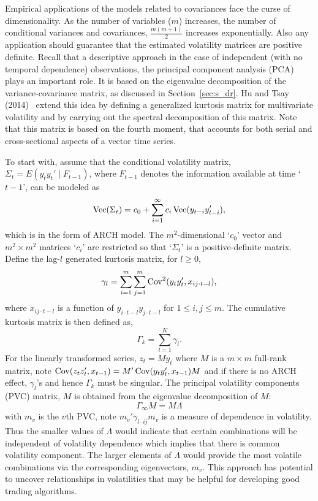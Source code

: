 Empirical applications of the models related to covariances face the curse of dimensionality. As the number of variables ($m$) increases, the number of conditional variances and covariances, $\frac{m(m+1)}{2}$ increases exponentially. Also any application should guarantee that the estimated volatility matrices are positive definite. Recall that a descriptive approach in the case of independent (with no temporal dependence) observations, the principal component analysis (PCA) plays an important role. It is based on the eigenvalue decomposition of the variance-covariance matrix, as discussed in Section~\ref{sec:s_dr}. Hu and Tsay (2014)~\cite{hutsay14} extend this idea by defining a generalized kurtosis matrix for multivariate volatility and by carrying out the spectral decomposition of this matrix. Note that this matrix is based on the fourth moment, that accounts for both serial and cross-sectional aspects of a vector time series.


To start with, assume that the conditional volatility matrix, $\Sigma_t= E(y_ty_t' \;|\; F_{t-1})$, where $F_{t-1}$ denotes the information available at time `$t-1$', can be modeled as
	\begin{equation} \label{eqn:vtmodel}
	\tbvec(\Sigma_t)= c_0 + \sum_{i=1}^\infty c_i \tbvec(y_{t-i} y_{t-i}'),
	\end{equation}
which is in the form of ARCH model. The $m^2$-dimensional `$c_0$' vector and $m^2 \times m^2$ matrices `$c_i$' are restricted so that `$\Sigma_t$' is a positive-definite matrix. Define the lag-$l$ generated kurtosis matrix, for $l \geq 0$,
	\begin{equation} \label{eqn:kurtosismat}
	\gamma_l = \sum_{i=1}^m \sum_{j=1}^m \cov^2(y_t y_t', x_{ij \cdot t - l} ),
	\end{equation}
where $x_{ij \cdot t - l}$ is a function of $y_{i \cdot t-l} y_{j \cdot t-l}$ for $1 \leq i,j \leq m$. The cumulative kurtosis matrix is then defined as,
	\begin{equation} \label{eqn:cumkurt}
	\Gamma_k= \sum_{l=1}^K \gamma_l.
	\end{equation}
For the linearly transformed series, $z_t= My_t$ where $M$ is a $m \times m$ full-rank matrix, note $\operatorname{Cov}(z_tz_t', x_{t-1})=M' \operatorname{Cov}(y_ty_t', x_{t-1}) M$ and if there is no ARCH effect, $\gamma_l$'s and hence $\Gamma_k$ must be singular. The principal volatility components (PVC) matrix, $M$ is obtained from the eigenvalue decomposition of $M$:
	\begin{equation} \label{eqn:obtainM}
	\Gamma_\infty M= M \Lambda
	\end{equation}
with $m_v$ is the $v$th PVC, note $m_v' \gamma_{l \cdot ij} m_v$ is a measure of dependence in volatility. Thus the smaller values of $\Lambda$ would indicate that certain combinations will be independent of volatility dependence which implies that there is common volatility component. The larger elements of $\Lambda$ would provide the most volatile combinations via the corresponding eigenvectors, $m_v$. This approach has potential to uncover relationships in volatilities that may be helpful for developing good trading algorithms. 



